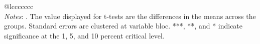 \begin{tabular}{@{\extracolsep{5pt}}lccccccc}
\hline \hline \\[-1.8ex]
{\textit{Notes}: . The value displayed for t-tests are the differences in the means across the groups. Standard errors are clustered at variable bloc. ***, **, and * indicate significance at the 1, 5, and 10 percent critical level. }
\end{tabular}
